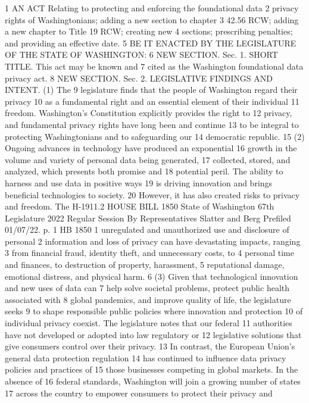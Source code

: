 1 AN ACT Relating to protecting and enforcing the foundational data
2 privacy rights of Washingtonians; adding a new section to chapter
3 42.56 RCW; adding a new chapter to Title 19 RCW; creating new
4 sections; prescribing penalties; and providing an effective date.
5 BE IT ENACTED BY THE LEGISLATURE OF THE STATE OF WASHINGTON:
6 NEW SECTION. Sec. 1. SHORT TITLE. This act may be known and
7 cited as the Washington foundational data privacy act.
8 NEW SECTION. Sec. 2. LEGISLATIVE FINDINGS AND INTENT. (1) The
9 legislature finds that the people of Washington regard their privacy
10 as a fundamental right and an essential element of their individual
11 freedom. Washington's Constitution explicitly provides the right to
12 privacy, and fundamental privacy rights have long been and continue
13 to be integral to protecting Washingtonians and to safeguarding our
14 democratic republic.
15 (2) Ongoing advances in technology have produced an exponential
16 growth in the volume and variety of personal data being generated,
17 collected, stored, and analyzed, which presents both promise and
18 potential peril. The ability to harness and use data in positive ways
19 is driving innovation and brings beneficial technologies to society.
20 However, it has also created risks to privacy and freedom. The
H-1911.2
HOUSE BILL 1850
State of Washington 67th Legislature 2022 Regular Session
By Representatives Slatter and Berg
Prefiled 01/07/22.
p. 1 HB 1850
1 unregulated and unauthorized use and disclosure of personal
2 information and loss of privacy can have devastating impacts, ranging
3 from financial fraud, identity theft, and unnecessary costs, to
4 personal time and finances, to destruction of property, harassment,
5 reputational damage, emotional distress, and physical harm.
6 (3) Given that technological innovation and new uses of data can
7 help solve societal problems, protect public health associated with
8 global pandemics, and improve quality of life, the legislature seeks
9 to shape responsible public policies where innovation and protection
10 of individual privacy coexist. The legislature notes that our federal
11 authorities have not developed or adopted into law regulatory or
12 legislative solutions that give consumers control over their privacy.
13 In contrast, the European Union's general data protection regulation
14 has continued to influence data privacy policies and practices of
15 those businesses competing in global markets. In the absence of
16 federal standards, Washington will join a growing number of states
17 across the country to empower consumers to protect their privacy and

